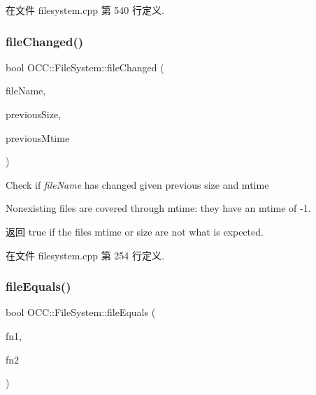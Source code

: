 在文件 filesystem.\+cpp 第 540 行定义.

\mbox{\label{namespace_o_c_c_1_1_file_system_aadc87cf3e494c9a930ecf856cc4f77d3}} 
\subsubsection{\texorpdfstring{file\+Changed()}{fileChanged()}}
{\footnotesize\ttfamily bool O\+C\+C\+::\+File\+System\+::file\+Changed (\begin{DoxyParamCaption}\item[{const Q\+String \&}]{file\+Name,  }\item[{qint64}]{previous\+Size,  }\item[{time\+\_\+t}]{previous\+Mtime }\end{DoxyParamCaption})}



Check if {\itshape file\+Name} has changed given previous size and mtime 

Nonexisting files are covered through mtime\+: they have an mtime of -\/1.

\begin{DoxyReturn}{返回}
true if the file\textquotesingle{}s mtime or size are not what is expected. 
\end{DoxyReturn}


在文件 filesystem.\+cpp 第 254 行定义.

\mbox{\label{namespace_o_c_c_1_1_file_system_a975974e9353410f28c9c2f280119174b}} 
\subsubsection{\texorpdfstring{file\+Equals()}{fileEquals()}}
{\footnotesize\ttfamily bool O\+C\+C\+::\+File\+System\+::file\+Equals (\begin{DoxyParamCaption}\item[{const Q\+String \&}]{fn1,  }\item[{const Q\+String \&}]{fn2 }\end{DoxyParamCaption})}



